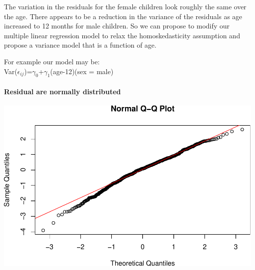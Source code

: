 \documentclass[
]{article}
\newenvironment{Shaded}{\begin{snugshade}}{\end{snugshade}}
\newcommand{\AttributeTok}[1]{\textcolor[rgb]{0.13,0.29,0.53}{#1}}
\newcommand{\FunctionTok}[1]{\textcolor[rgb]{0.13,0.29,0.53}{\textbf{#1}}}
\newcommand{\NormalTok}[1]{#1}
\newcommand{\SpecialCharTok}[1]{\textcolor[rgb]{0.81,0.36,0.00}{\textbf{#1}}}
\newcommand{\StringTok}[1]{\textcolor[rgb]{0.31,0.60,0.02}{#1}}
\begin{document}
The variation in the residuals for the female children look roughly the
same over the age. There appears to be a reduction in the variance of
the residuals as age increased to 12 months for male children. So we can
propose to modify our multiple linear regression model to relax the
homoskedasticity assumption and propose a variance model that is a
function of age.

For example our model may be:\\
Var(\(\epsilon_{ij}\))=\(\gamma_0\)+\(\gamma_1\)\textbar(age-12)\textbar(sex
= male)

\hypertarget{residual-are-normally-distributed}{%
\paragraph{Residual are normally
distributed}\label{residual-are-normally-distributed}}

\begin{Shaded}
\end{Shaded}

\includegraphics{ProblemSet3_Siyu_Zou_files/figure-latex/unnamed-chunk-12-1.pdf}
\end{document}
